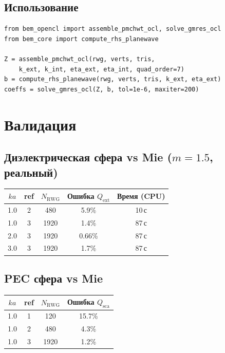 \documentclass[12pt,a4paper]{article}
\begin{document}
\subsection{Использование}

\begin{lstlisting}
from bem_opencl import assemble_pmchwt_ocl, solve_gmres_ocl
from bem_core import compute_rhs_planewave

Z = assemble_pmchwt_ocl(rwg, verts, tris,
    k_ext, k_int, eta_ext, eta_int, quad_order=7)
b = compute_rhs_planewave(rwg, verts, tris, k_ext, eta_ext)
coeffs = solve_gmres_ocl(Z, b, tol=1e-6, maxiter=200)
\end{lstlisting}


\section{Валидация}

\subsection{Диэлектрическая сфера vs Mie ($m = 1.5$, реальный)}

\begin{center}
\begin{tabular}{ccccc}
\toprule
$ka$ & ref & $N_{\mathrm{RWG}}$ & Ошибка $Q_{\mathrm{ext}}$ & Время (CPU) \\
\midrule
1.0 & 2 & 480 & 5.9\% & 10\,с \\
1.0 & 3 & 1920 & 1.4\% & 87\,с \\
2.0 & 3 & 1920 & 0.66\% & 87\,с \\
3.0 & 3 & 1920 & 1.7\% & 87\,с \\
\bottomrule
\end{tabular}
\end{center}

\subsection{PEC сфера vs Mie}

\begin{center}
\begin{tabular}{cccc}
\toprule
$ka$ & ref & $N_{\mathrm{RWG}}$ & Ошибка $Q_{\mathrm{sca}}$ \\
\midrule
1.0 & 1 & 120 & 15.7\% \\
1.0 & 2 & 480 & 4.3\% \\
1.0 & 3 & 1920 & 1.2\% \\
\bottomrule
\end{tabular}
\end{center}
\end{document}

